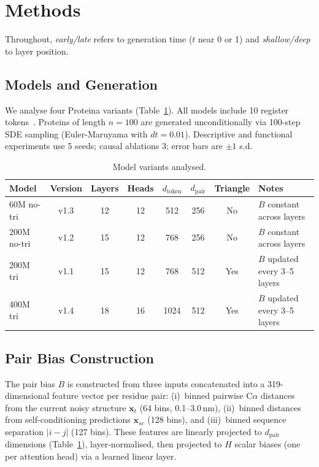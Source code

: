 \documentclass{article}
\begin{document}
\section{Methods}
\label{sec:methods}

Throughout, \emph{early/late} refers to generation time ($t$ near 0 or 1) and \emph{shallow/deep} to layer position.

\subsection{Models and Generation}

We analyse four Proteina variants (Table~\ref{tab:models}).
All models include 10 register tokens~\citep{darcet2024registers}.
Proteins of length $n{=}100$ are generated unconditionally via 100-step SDE sampling (Euler-Maruyama with $dt{=}0.01$).
Descriptive and functional experiments use 5 seeds; causal ablations 3; error bars are $\pm 1$ s.d.

\begin{table}[h]
    \centering
    \caption{Model variants analysed.}
    \label{tab:models}
    \begin{tabular}{lccccccp{3.8cm}}
        \toprule
        Model & Version & Layers & Heads & $d_\text{token}$ & $d_\text{pair}$ & Triangle & Notes \\
        \midrule
        60M no-tri & v1.3 & 12 & 12 & 512 & 256 & No & $B$ constant across layers \\
        200M no-tri & v1.2 & 15 & 12 & 768 & 256 & No & $B$ constant across layers \\
        200M tri & v1.1 & 15 & 12 & 768 & 512 & Yes & $B$ updated every 3--5 layers \\
        400M tri & v1.4 & 18 & 16 & 1024 & 512 & Yes & $B$ updated every 3--5 layers \\
        \bottomrule
    \end{tabular}
\end{table}

\subsection{Pair Bias Construction}

The pair bias $B$ is constructed from three inputs concatenated into a 319-dimensional feature vector per residue pair: (i)~binned pairwise C$\alpha$ distances from the current noisy structure $\mathbf{x}_t$ (64 bins, 0.1--3.0\,nm), (ii)~binned distances from self-conditioning predictions $\mathbf{x}_{sc}$ (128 bins), and (iii)~binned sequence separation $|i{-}j|$ (127 bins).
These features are linearly projected to $d_\text{pair}$ dimensions (Table~\ref{tab:models}), layer-normalised, then projected to $H$ scalar biases (one per attention head) via a learned linear layer.
\end{document}
